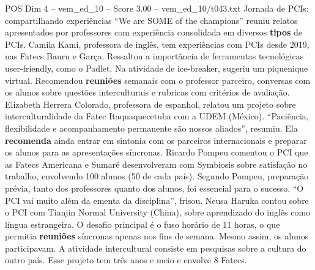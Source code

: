 \begin{textsample}{POS Dim 4 – vem\_ed\_10 – Score 3.00 – vem\_ed\_10/t043.txt}  \label{ex:f4_pos_136}
Jornada de PCIs: compartilhando experiências “We are SOME of the champions” reuniu relatos apresentados por professores com experiência consolidada em diversos \textbf{tipos} de PCIs.
Camila Kami, professora de inglês, tem experiências com PCIs desde 2019, nas Fatecs Bauru e Garça.
Ressaltou a importância de ferramentas tecnológicas user-friendly, como o Padlet.
Na atividade de ice-breaker, sugeriu um piquenique virtual.
Recomendou \textbf{reuniões} semanais com o professor parceiro, conversas com os alunos sobre questões interculturais e rubricas com critérios de avaliação.
Elizabeth Herrera Colorado, professora de espanhol, relatou um projeto sobre interculturalidade da Fatec Itaquaquecetuba com a UDEM (México). “Paciência, flexibilidade e acompanhamento permanente são nossos aliados”, resumiu.
Ela \textbf{recomenda} ainda entrar em sintonia com os parceiros internacionais e preparar os alunos para as apresentações síncronas.
Ricardo Pompeu comentou o PCI que as Fatecs Americana e Sumaré desenvolveram com Symbiosis sobre satisfação no trabalho, envolvendo 100 alunos (50 de cada país).
Segundo Pompeu, preparação prévia, tanto dos professores quanto dos alunos, foi essencial para o sucesso. “O PCI vai muito além da ementa da disciplina”, frisou.
Neusa Haruka contou sobre o PCI com Tianjin Normal University (China), sobre aprendizado do inglês como língua estrangeira.
O desafio principal é o fuso horário de 11 horas, o que permitia \textbf{reuniões} síncronas apenas nos fins de semana.
Mesmo assim, os alunos participavam.
A atividade intercultural consiste em pesquisas sobre a cultura do outro país.
Esse projeto tem três anos e meio e envolve 8 Fatecs.

\end{textsample}
